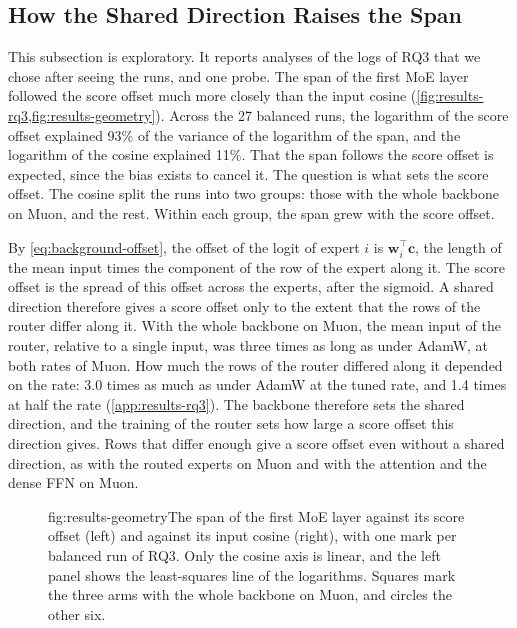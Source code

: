 \subsection{How the Shared Direction Raises the Span}
\label{sec:results-offset}
This subsection is exploratory. It reports analyses of the logs of RQ3 that we chose after seeing the runs, and one probe. The span of the first MoE layer followed the score offset much more closely than the input cosine (\cref{fig:results-rq3,fig:results-geometry}). Across the 27 balanced runs, the logarithm of the score offset explained 93\% of the variance of the logarithm of the span, and the logarithm of the cosine explained 11\%. That the span follows the score offset is expected, since the bias exists to cancel it. The question is what sets the score offset. The cosine split the runs into two groups: those with the whole backbone on Muon, and the rest. Within each group, the span grew with the score offset.

By \cref{eq:background-offset}, the offset of the logit of expert $i$ is $\mathbf{w}_i^{\top} \mathbf{c}$, the length of the mean input times the component of the row of the expert along it. The score offset is the spread of this offset across the experts, after the sigmoid. A shared direction therefore gives a score offset only to the extent that the rows of the router differ along it. With the whole backbone on Muon, the mean input of the router, relative to a single input, was three times as long as under AdamW, at both rates of Muon. How much the rows of the router differed along it depended on the rate: 3.0 times as much as under AdamW at the tuned rate, and 1.4 times at half the rate (\cref{app:results-rq3}). The backbone therefore sets the shared direction, and the training of the router sets how large a score offset this direction gives. Rows that differ enough give a score offset even without a shared direction, as with the routed experts on Muon and with the attention and the dense FFN on Muon.

\begin{figure}[The span against the score offset and the input cosine in RQ3]{fig:results-geometry}{The span of the first MoE layer against its score offset (left) and against its input cosine (right), with one mark per balanced run of RQ3. Only the cosine axis is linear, and the left panel shows the least-squares line of the logarithms. Squares mark the three arms with the whole backbone on Muon, and circles the other six.}
  
\end{figure}

